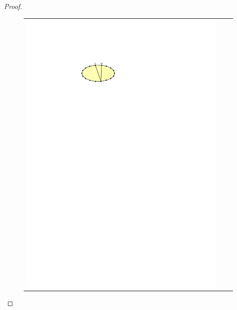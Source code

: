 \documentclass{article}
\theoremstyle{definition}
\begin{document}
\begin{proof}
\begin{figure}
\begin{tabular}{ccc}
      \includegraphics[page=3]{figs/minimal} &

\end{tabular}
\end{figure}
\end{proof}
\end{document}
